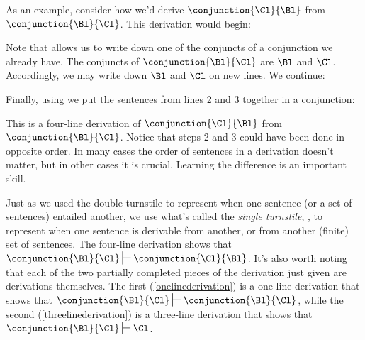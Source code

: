 As an example, consider how we'd derive $\conjunction{\Cl}{\Bl}$ from $\conjunction{\Bl}{\Cl}$. This derivation would begin:
\begin{gproof}[\label{onelinederivation}]
\end{gproof}
\noindent{}Note that  allows us to write down one of the conjuncts of a conjunction we already have. 
The conjuncts of $\conjunction{\Bl}{\Cl}$ are $\Bl$ and $\Cl$. 
Accordingly, we may write down $\Bl$ and $\Cl$ on new lines. 
We continue:
\begin{gproof}[\label{threelinederivation}]
\end{gproof}
\noindent{}Finally, using  we put the sentences from lines 2 and 3 together in a conjunction:
\begin{gproof}[\label{simpleconjunction}]
\end{gproof}
\noindent{}This is a four-line derivation of $\conjunction{\Cl}{\Bl}$ from $\conjunction{\Bl}{\Cl}$. Notice that steps 2 and 3 could have been done in opposite order. In many cases the order of sentences in a derivation doesn’t matter, but in other cases it is crucial. Learning the difference is an important skill.

Just as we used the double turnstile to represent when one sentence (or a set of sentences) entailed another, we use what's called the \emph{single turnstile}, \mention{\:$\sststile{}{}\:$}, to represent when one sentence is derivable from another, or from another (finite) set of sentences. 
The four-line derivation shows that $\conjunction{\Bl}{\Cl}\sststile{}{}\conjunction{\Cl}{\Bl}$. 
It's also worth noting that each of the two partially completed pieces of the derivation just given are derivations themselves. 
The first (\ref{onelinederivation}) is a one-line derivation that shows that $\conjunction{\Bl}{\Cl}\sststile{}{}\conjunction{\Bl}{\Cl}$, while the second (\ref{threelinederivation}) is a three-line derivation that shows that $\conjunction{\Bl}{\Cl}\sststile{}{}\Cl$.

